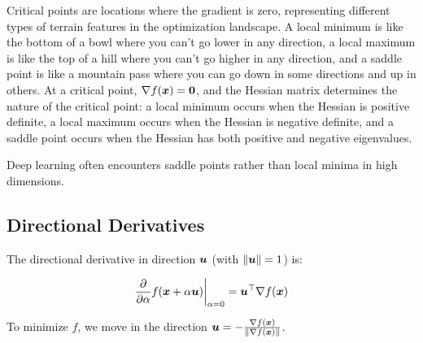 Critical points are locations where the gradient is zero, representing different types of terrain features in the optimization landscape. A local minimum is like the bottom of a bowl where you can't go lower in any direction, a local maximum is like the top of a hill where you can't go higher in any direction, and a saddle point is like a mountain pass where you can go down in some directions and up in others. At a critical point, $\nabla f(\boldsymbol{x}) = \boldsymbol{0}$, and the Hessian matrix determines the nature of the critical point: a local minimum occurs when the Hessian is positive definite, a local maximum occurs when the Hessian is negative definite, and a saddle point occurs when the Hessian has both positive and negative eigenvalues.

\begin{center}
\end{center}

Deep learning often encounters saddle points rather than local minima in high dimensions.

\subsection{Directional Derivatives}

The directional derivative in direction $\boldsymbol{u}$ (with $\|\boldsymbol{u}\| = 1$) is:

\begin{equation}
\frac{\partial}{\partial \alpha} f(\boldsymbol{x} + \alpha \boldsymbol{u}) \bigg|_{\alpha=0} = \boldsymbol{u}^\top \nabla f(\boldsymbol{x})
\end{equation}

To minimize $f$, we move in the direction $\boldsymbol{u} = -\frac{\nabla f(\boldsymbol{x})}{\|\nabla f(\boldsymbol{x})\|}$.
